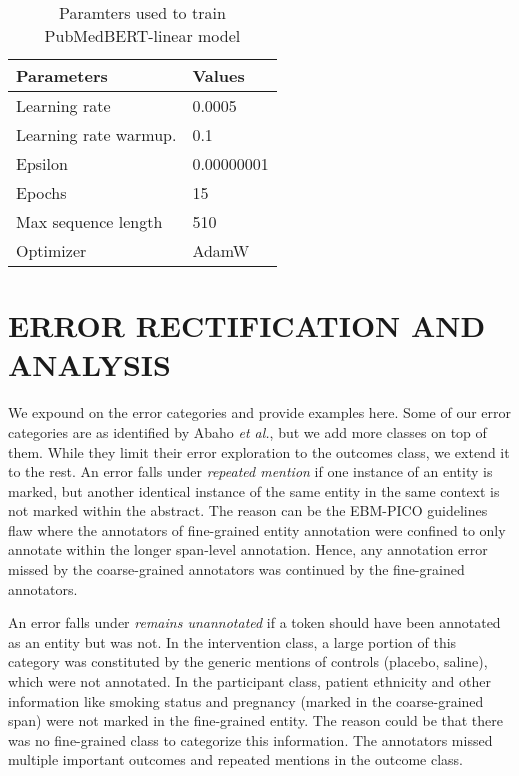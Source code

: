 \documentclass[10.7pt,]{article}
\begin{document}
%
\begin{table}[ht]
\centering
\begin{tabular}{|l|l|}
\hline
Parameters               & Values                            \\
\hline
Learning rate           & 0.0005                             \\
Learning rate warmup.   & 0.1                               \\
Epsilon                 & 0.00000001                         \\
Epochs                  & 15                                 \\
Max sequence length     & 510                                \\
Optimizer               & AdamW                              \\
\hline
\end{tabular}
\caption{\label{ws:params} Paramters used to train PubMedBERT-linear model}
\end{table}
%
%
%
\section{ERROR RECTIFICATION AND ANALYSIS}\label{params}
%
We expound on the error categories and provide examples here.
Some of our error categories are as identified by Abaho \textit{et al.}, but we add more classes on top of them.
While they limit their error exploration to the outcomes class, we extend it to the rest.
An error falls under \textit{repeated mention} if one instance of an entity is marked, but another identical instance of the same entity in the same context is not marked within the abstract. 
The reason can be the EBM-PICO guidelines flaw where the annotators of fine-grained entity annotation were confined to only annotate within the longer span-level annotation.
Hence, any annotation error missed by the coarse-grained annotators was continued by the fine-grained annotators.



An error falls under \textit{remains unannotated} if a token should have been annotated as an entity but was not.
In the intervention class, a large portion of this category was constituted by the generic mentions of controls (placebo, saline), which were not annotated.
In the participant class, patient ethnicity and other information like smoking status and pregnancy (marked in the coarse-grained span) were not marked in the fine-grained entity.
The reason could be that there was no fine-grained class to categorize this information. 
The annotators missed multiple important outcomes and repeated mentions in the outcome class.
\end{document}
